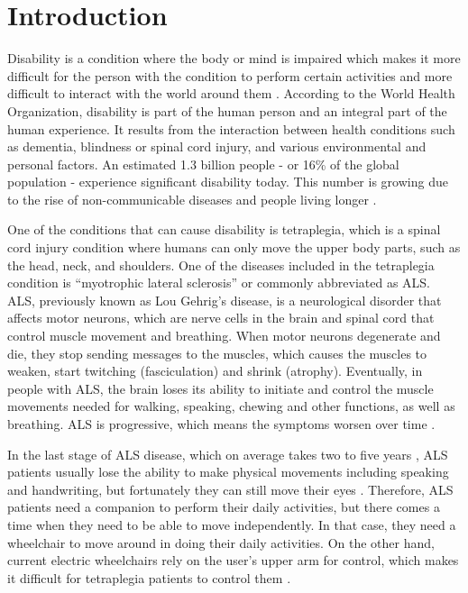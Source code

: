 \section{Introduction}
\label{sec:introduction}

Disability is a condition where the body or mind is impaired which makes it more difficult for the person with the condition to perform certain activities and more difficult to interact with the world around them \cite{CDC_2020}. According to the World Health Organization, disability is part of the human person and an integral part of the human experience. It results from the interaction between health conditions such as dementia, blindness or spinal cord injury, and various environmental and personal factors. An estimated 1.3 billion people - or 16\% of the global population - experience significant disability today. This number is growing due to the rise of non-communicable diseases and people living longer \cite{WHO_2023}.

One of the conditions that can cause disability is tetraplegia, which is a spinal cord injury condition where humans can only move the upper body parts, such as the head, neck, and shoulders. One of the diseases included in the tetraplegia condition is “myotrophic lateral sclerosis” or commonly abbreviated as ALS. ALS, previously known as Lou Gehrig's disease, is a neurological disorder that affects motor neurons, which are nerve cells in the brain and spinal cord that control muscle movement and breathing. When motor neurons degenerate and die, they stop sending messages to the muscles, which causes the muscles to weaken, start twitching (fasciculation) and shrink (atrophy). Eventually, in people with ALS, the brain loses its ability to initiate and control the muscle movements needed for walking, speaking, chewing and other functions, as well as breathing. ALS is progressive, which means the symptoms worsen over time \cite{NINDS}. 

In the last stage of ALS disease, which on average takes two to five years \cite{ALS_2023}, ALS patients usually lose the ability to make physical movements including speaking and handwriting, but fortunately they can still move their eyes \cite{Eyesay_2023}. Therefore, ALS patients need a companion to perform their daily activities, but there comes a time when they need to be able to move independently. In that case, they need a wheelchair to move around in doing their daily activities. On the other hand, current electric wheelchairs rely on the user's upper arm for control, which makes it difficult for tetraplegia patients to control them \cite{9935646}. 


